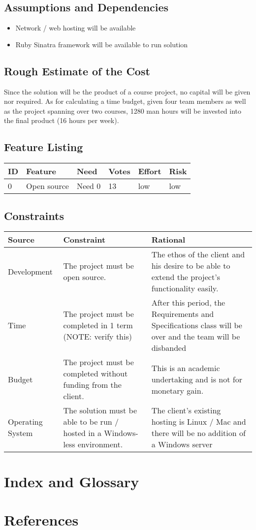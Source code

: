 \documentclass{article}
\begin{document}
\subsection{Assumptions and Dependencies}
\begin{itemize}
\item Network / web hosting will be available
\item Ruby Sinatra framework will be available to run solution
\end{itemize}

\subsection{Rough Estimate of the Cost}
Since the solution will be the product of a course project, no capital will be given nor required.  As for calculating a time budget, given four team members as well as the project spanning over two courses, 1280 man hours will be invested into the final product (16 hours per week).
\subsection{Feature Listing}
\begin{tabular}{ | l | l | l | l | l | l | }
\hline
ID & Feature & Need & Votes & Effort & Risk\\
\hline
0 & Open source & Need 0 & 13 & low & low\\
\hline
\end{tabular}
\subsection{Constraints}
\begin{tabular}{ | l | l | l | }
\hline
Source & Constraint & Rational\\
\hline
Development & The project must be open source. & The ethos of the client and his desire to be able to extend the project’s functionality easily.\\
\hline
Time & The project must be completed in 1 term (NOTE: verify this) & After this period, the Requirements and Specifications class will be over and the team will be disbanded\\
\hline
Budget & The project must be completed without funding from the client. & This is an academic undertaking and is not for monetary gain.\\
\hline
Operating System & The solution must be able to be run / hosted in a Windows-less environment. & The client’s existing hosting is Linux / Mac and there will be no addition of a Windows server\\
\hline
\end{tabular}

\section{Index and Glossary}

\section{References}
\end{document}
